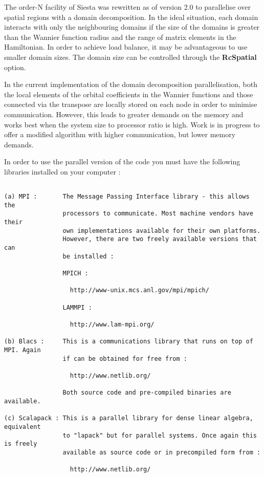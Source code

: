 \documentclass[11pt]{article}
\begin{document}
The order-N facility of {\sc Siesta} was rewritten as of version 2.0
to parallelise over spatial regions with a domain decomposition. In the 
ideal situation, each domain interacts with only the neighbouring domains
if the size of the domains is greater than the Wannier function radius and
the range of matrix elements in the Hamiltonian. In order to achieve load
balance, it may be advantageous to use smaller domain sizes. The domain 
size can be controlled through the {\bf RcSpatial} option. 

In the current implementation of the domain decomposition parallelisation,
both the local elements of the orbital coefficients in the Wannier functions
and those connected via the transpose are locally stored on each node in order
to minimise communication. However, this leads to greater demands on the memory
and works best when the system size to processor ratio is high. Work is in 
progress to offer a modified algorithm with higher communication, but lower
memory demands. 

In order to use the parallel version of the code you must have the following
libraries installed on your computer :

\begin{verbatim}

(a) MPI :       The Message Passing Interface library - this allows the 
                processors to communicate. Most machine vendors have their 
                own implementations available for their own platforms. 
                However, there are two freely available versions that can 
                be installed :

                MPICH :

                  http://www-unix.mcs.anl.gov/mpi/mpich/

                LAMMPI :

                  http://www.lam-mpi.org/

(b) Blacs :     This is a communications library that runs on top of MPI. Again
                if can be obtained for free from :

                  http://www.netlib.org/

                Both source code and pre-compiled binaries are available.

(c) Scalapack : This is a parallel library for dense linear algebra, equivalent
                to "lapack" but for parallel systems. Once again this is freely
                available as source code or in precompiled form from :

                  http://www.netlib.org/

\end{verbatim}
\end{document}
